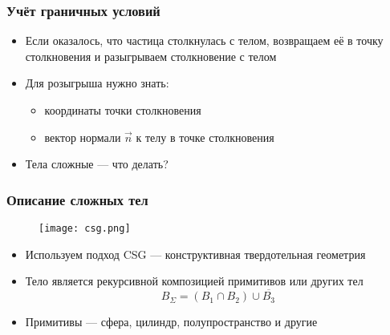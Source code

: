 \documentclass[onlymath]{beamer}
\begin{document}
\begin{frame}[fragile]
  \frametitle{Учёт граничных условий}
  \begin{itemize}
  \item Если оказалось, что частица столкнулась с телом, возвращаем её
    в точку столкновения и разыгрываем столкновение с телом
  \item Для розыгрыша нужно знать:
    \begin{itemize}
      \item координаты точки столкновения
      \item вектор нормали $\vec{n}$ к телу в точке столкновения
    \end{itemize}
  \item Тела сложные — что делать?
  \end{itemize}
\end{frame}

\begin{frame}
  \frametitle{Описание сложных тел}
  \begin{figure}
    \centering
    \texttt{[image: csg.png]}
  \end{figure}
  \begin{itemize}
  \item Используем подход CSG — конструктивная твердотельная геометрия
  \item Тело является рекурсивной композицией примитивов или других
    тел
    \begin{equation}
      B_\Sigma = (B_1 \cap B_2) \cup \overline{B_3}
    \end{equation}
  \item Примитивы — сфера, цилиндр, полупространство и другие
  \end{itemize}
\end{frame}
\end{document}
